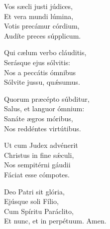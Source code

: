 Vos sæcli justi júdices,\\
Et vera mundi lúmina,\\
Votis precámur córdium,\\
Audíte preces súpplicum.

Qui cælum verbo cláuditis,\\
Serásque ejus sólvitis:\\
Nos a peccátis ómnibus\\
Sólvite jussu, quǽsumus.

Quorum præcépto súbditur,\\
Salus, et languor ómnium:\\
Sanáte ægros móribus,\\
Nos reddéntes virtútibus.

Ut cum Judex advénerit\\
Christus in fine sǽculi,\\
Nos sempitérni gáudii\\
Fáciat esse cómpotes.

Deo Patri sit glória,\\
Ejúsque soli Fílio,\\
Cum Spíritu Paráclito,\\
Et nunc, et in perpétuum.
Amen.